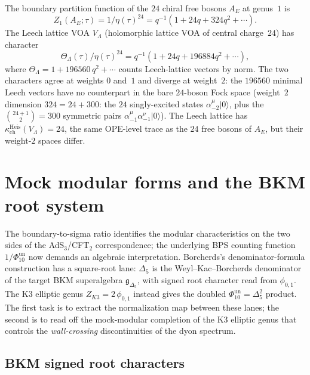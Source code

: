 \begin{remark}
\label{rem:leech-connection}
The boundary partition function of the $24$ chiral free bosons
$A_E$ at genus~$1$ is
\[
Z_1(A_E;\tau) = 1/\eta(\tau)^{24} = q^{-1}(1 + 24q + 324q^2 + \cdots).
\]
The Leech lattice VOA $V_\Lambda$ (holomorphic lattice VOA of
central charge~$24$) has character
\[
\Theta_\Lambda(\tau)/\eta(\tau)^{24} = q^{-1}(1 + 24q + 196884q^2 + \cdots),
\]
where $\Theta_\Lambda = 1 + 196560\,q^2 + \cdots$ counts
Leech-lattice vectors by norm. The two characters
agree at weights $0$ and~$1$ and diverge at weight~$2$:
the $196560$ minimal Leech vectors have no counterpart
in the bare $24$-boson Fock space (weight~$2$ dimension
$324 = 24 + 300$: the $24$ singly-excited states
$\alpha^\mu_{-2}|0\rangle$, plus the
$\binom{24+1}{2} = 300$ symmetric pairs
$\alpha^\mu_{-1}\alpha^\nu_{-1}|0\rangle$).
The Leech lattice has $\kappa_{\mathrm{ch}}^{\mathrm{Heis}}(V_\Lambda) = 24$,
the same OPE-level trace as the $24$ free bosons of $A_E$,
but their weight-$2$ spaces differ.
\end{remark}



\section{Mock modular forms and the BKM root system}
\label{sec:mock-modular-bkm}

The boundary-to-sigma ratio identifies the modular characteristics
on the two sides of the AdS$_3$/CFT$_2$ correspondence; the
underlying BPS counting function \(1/\Phi_{10}^{\mathrm{un}}\) now demands an
algebraic interpretation. Borcherds's denominator-formula construction
has a square-root lane: \(\Delta_5\) is the Weyl--Kac--Borcherds
denominator of the target BKM superalgebra
\(\mathfrak g_{\Delta_5}\), with signed root character read from
\(\phi_{0,1}\). The K3 elliptic genus
\(Z_{K3}=2\,\phi_{0,1}\) instead gives the doubled
\(\Phi_{10}^{\mathrm{un}}=\Delta_5^2\) product. The first task is to
extract the normalization map between these lanes; the second is to read off the
mock-modular completion of the K3 elliptic genus that controls
the \emph{wall-crossing} discontinuities of the dyon spectrum.

\subsection{BKM signed root characters}
\label{subsec:bkm-roots}

